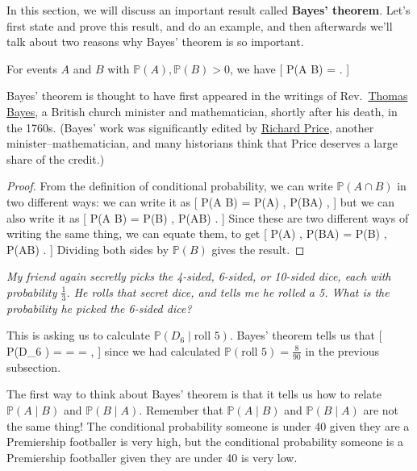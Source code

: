 \documentclass[
  letterpaper,
  DIV=11,
  numbers=noendperiod]{scrreprt}
\theoremstyle{remark}
\begin{document}
In this section, we will discuss an important result called
\textbf{Bayes' theorem}. Let's first state and prove this result, and do
an example, and then afterwards we'll talk about two reasons why Bayes'
theorem is so important.

\leavevmode{}%
For events \(A\) and \(B\) with \(\mathbb P(A), \mathbb P(B) > 0\), we
have {[} \mathbb P(A \mid B) =
 . {]}

Bayes' theorem is thought to have first appeared in the writings of
Rev.~\href{https://mathshistory.st-andrews.ac.uk/Biographies/Bayes/}{Thomas
Bayes}, a British church minister and mathematician, shortly after his
death, in the 1760s. (Bayes' work was significantly edited by
\href{https://mathshistory.st-andrews.ac.uk/Biographies/Price/}{Richard
Price}, another minister--mathematician, and many historians think that
Price deserves a large share of the credit.)

\begin{proof}

From the definition of conditional probability, we can write
\(\mathbb P(A \cap B)\) in two different ways: we can write it as {[}
\mathbb P(A \cap B) = \mathbb P(A) , \mathbb P(B\mid A) , {]} but we can
also write it as {[} \mathbb P(A \cap B) = \mathbb P(B) ,
\mathbb P(A\mid B) . {]} Since these are two different ways of writing
the same thing, we can equate them, to get {[} \mathbb P(A) ,
\mathbb P(B\mid A) = \mathbb P(B) , \mathbb P(A\mid B) . {]} Dividing
both sides by \(\mathbb P(B)\) gives the result.

\end{proof}

\emph{My friend again secretly picks the 4-sided, 6-sided, or 10-sided
dice, each with probability \(\frac13\). He rolls that secret dice, and
tells me he rolled a 5. What is the probability he picked the 6-sided
dice?}

This is asking us to calculate \(\mathbb P(D_6 \mid \text{roll 5})\).
Bayes' theorem tells us that {[} \mathbb P(D\_6 \mid {}) =
=  =  , {]} since
we had calculated \(\mathbb P(\text{roll 5}) = \frac{8}{90}\) in the
previous subsection.

The first way to think about Bayes' theorem is that it tells us how to
relate \(\mathbb P(A \mid B)\) and \(\mathbb P(B \mid A)\). Remember
that \(\mathbb P(A \mid B)\) and \(\mathbb P(B \mid A)\) are not the
same thing! The conditional probability someone is under 40 given they
are a Premiership footballer is very high, but the conditional
probability someone is a Premiership footballer given they are under 40
is very low.
\end{document}
